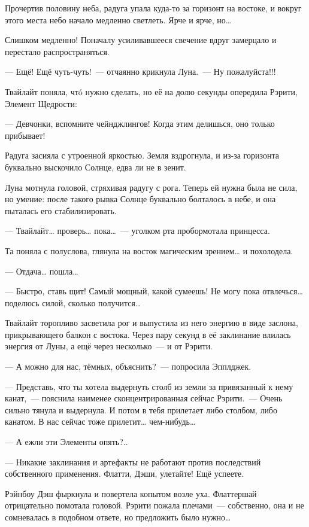 \documentclass[twoside,a5paper,12pt]{extbook}
\begin{document}
Прочертив половину неба, радуга упала куда-то за горизонт на востоке, и вокруг этого места небо начало медленно светлеть. Ярче и ярче, но…

Слишком медленно! Поначалу усиливавшееся свечение вдруг замерцало и перестало распространяться.

— Ещё! Ещё чуть-чуть! — отчаянно крикнула Луна. — Ну пожалуйста!!!

Твайлайт поняла, чтó нужно сделать, но её на долю секунды опередила Рэрити, Элемент Щедрости:

— Девчонки, вспомните чейнджлингов! Когда этим делишься, оно только прибывает!

Радуга засияла с утроенной яркостью. Земля вздрогнула, и из-за горизонта буквально выскочило Солнце, едва ли не в зенит.

Луна мотнула головой, стряхивая радугу с рога. Теперь ей нужна была не сила, но умение: после такого рывка Солнце буквально болталось в небе, и она пыталась его стабилизировать.

— Твайлайт… проверь… пока… — уголком рта пробормотала принцесса.

Та поняла с полуслова, глянула на восток магическим зрением… и похолодела.

— Отдача… пошла…

— Быстро, ставь щит! Самый мощный, какой сумеешь! Не могу пока отвлечься… поделюсь силой, сколько получится…

Твайлайт торопливо засветила рог и выпустила из него энергию в виде заслона, прикрывающего балкон с востока. Через пару секунд в её заклинание влилась энергия от Луны, а ещё через несколько — и от Рэрити.

— А можно для нас, тёмных, объяснить? — попросила Эпплджек.

— Представь, что ты хотела выдернуть столб из земли за привязанный к нему канат, — пояснила наименее сконцентрированная сейчас Рэрити. — Очень сильно тянула и выдернула. И потом в тебя прилетает либо столбом, либо канатом. В нас сейчас тоже прилетит… чем-нибудь…

— А ежли эти Элементы опять?..

— Никакие заклинания и артефакты не работают против последствий собственного применения. Флатти, Дэши, улетайте! Ещё успеете.

Рэйнбоу Дэш фыркнула и повертела копытом возле уха. Флаттершай отрицательно помотала головой. Рэрити пожала плечами — собственно, она и не сомневалась в подобном ответе, но предложить было нужно…
\end{document}
